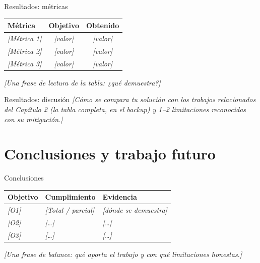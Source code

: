 \documentclass[11pt, aspectratio=169]{beamer}
\newcommand{\ph}[1]{\texorpdfstring{\textcolor{grisplaceholder}{\textit{[#1]}}}{[#1]}}
\begin{document}
\begin{frame}{Resultados: métricas}
  \begin{center}
    \begin{tabular}{lcc}
      \toprule
      \textbf{Métrica} & \textbf{Objetivo} & \textbf{Obtenido} \\
      \midrule
      \ph{Métrica 1} & \ph{valor} & \ph{valor} \\
      \ph{Métrica 2} & \ph{valor} & \ph{valor} \\
      \ph{Métrica 3} & \ph{valor} & \ph{valor} \\
      \bottomrule
    \end{tabular}
  \end{center}
  \ph{Una frase de lectura de la tabla: ¿qué demuestra?}
\end{frame}

\begin{frame}{Resultados: discusión}
  \ph{Cómo se compara tu solución con los trabajos relacionados del
  Capítulo 2 (la tabla completa, en el backup) y 1--2 limitaciones
  reconocidas con su mitigación.}
\end{frame}

\section{Conclusiones y trabajo futuro}

\begin{frame}{Conclusiones}
  \begin{center}
    \begin{tabular}{lll}
      \toprule
      \textbf{Objetivo} & \textbf{Cumplimiento} & \textbf{Evidencia} \\
      \midrule
      \ph{O1} & \ph{Total / parcial} & \ph{dónde se demuestra} \\
      \ph{O2} & \ph{\dots} & \ph{\dots} \\
      \ph{O3} & \ph{\dots} & \ph{\dots} \\
      \bottomrule
    \end{tabular}
  \end{center}
  \ph{Una frase de balance: qué aporta el trabajo y con qué
  limitaciones honestas.}
\end{frame}
\end{document}
